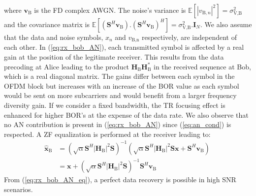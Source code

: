 \documentclass[journal,comsoc]{IEEEtran}
\newcommand{\module}[1]{\left|#1\right|}
\newcommand{\EX}[1]{\mathbb{E} \left[#1\right]}%
\newcommand{\HB}{\textbf{H}_{\text{B}}}
\newcommand{\spread}{\textbf{S}}
\begin{document}
where $\textbf{v}_\text{B}$ is the FD complex AWGN. The noise's variance is $\EX{|v_{\text{B},n}|^2}  = \sigma_{\text{V,B}}^2$ and the covariance matrix is $\EX{(\spread^H  \textbf{v}_\text{B}) . (\spread^H \textbf{v}_\text{B})^H} = \sigma_{\text{V,B}}^2 . \textbf{I}_N$. We also assume that the data and noise symbols,  $x_n$ and $v_{\text{B,n}}$ respectively, are independent of each other. In (\ref{eq:rx_bob_AN}), each transmitted symbol is affected by a real gain at the position of the legitimate receiver. This results from the data precoding at Alice leading to the product $\HB\HB^*$ in the received sequence at Bob, which is a real diagonal matrix. The gains differ between each symbol in the OFDM block but increases with an increase of the BOR value as each symbol would be sent on more subcarriers and would benefit from a larger frequency diversity gain. If we consider a fixed bandwidth, the TR focusing effect is enhanced for higher BOR's at the expense of the data rate. We also observe that no AN contribution is present in (\ref{eq:rx_bob_AN}) since (\ref{eq:an_cond}) is respected. A ZF equalization is performed at the receiver leading to:
\begin{equation}
	\begin{split}
		\hat{\textbf{x}}_{\text{B}} &= \left( \sqrt{\alpha} \spread^H \module{\HB}^2 \spread \right)^{-1}  \left(\sqrt{\alpha}  \spread^H\module{\HB}^2 \spread \textbf{x}   +    \spread^H \textbf{v}_\text{B}\right) \\
		&= \textbf{x} + \left( \sqrt{\alpha} \spread^H \module{\HB}^2 \spread \right)^{-1} \spread^H \textbf{v}_\text{B}
	\end{split}
	\
	\label{eq:rx_bob_AN_eq}
\end{equation}
From (\ref{eq:rx_bob_AN_eq}), a perfect data recovery is possible in high SNR scenarios.



%
\end{document}
